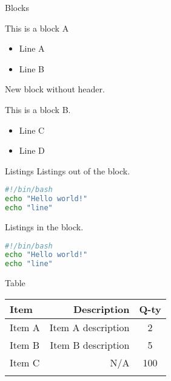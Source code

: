 \documentclass[
  11pt,
  ignorenonframetext,
  aspectratio=169]{beamer}
\providecommand{\tightlist}{%
  \setlength{\itemsep}{0pt}\setlength{\parskip}{0pt}}
\begin{document}
\begin{frame}{Blocks}
\label{blocks}
\begin{block}{This is a block A}
\label{this-is-a-block-a}
\begin{itemize}
\tightlist
\item
  Line A
\item
  Line B
\end{itemize}

New block without header.
\end{block}

\begin{block}{This is a block B.}
\label{this-is-a-block-b.}
\begin{itemize}
\tightlist
\item
  Line C
\item
  Line D
\end{itemize}
\end{block}
\end{frame}

\begin{frame}[fragile]{Listings}
\label{listings}
Listings out of the block.

\begin{lstlisting}[language=sh]
#!/bin/bash
echo "Hello world!"
echo "line"
\end{lstlisting}

\begin{block}{Listings in the block.}
\label{listings-in-the-block.}
\begin{lstlisting}[language=sh]
#!/bin/bash
echo "Hello world!"
echo "line"
\end{lstlisting}
\end{block}
\end{frame}

\begin{frame}{Table}
\label{table}
\begin{longtable}[]{@{}lrc@{}}
\toprule\noalign{}
\textbf{Item} & \textbf{Description} & \textbf{Q-ty} \\
\midrule\noalign{}
\endhead
Item A & Item A description & 2 \\
Item B & Item B description & 5 \\
Item C & N/A & 100 \\
\bottomrule\noalign{}
\end{longtable}
\end{frame}
\end{document}
